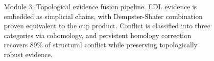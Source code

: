 \begin{figure}[ht]
\caption{Module 3: Topological evidence fusion pipeline. EDL evidence is embedded as simplicial chains, with Dempster-Shafer combination proven equivalent to the cup product. Conflict is classified into three categories via cohomology, and persistent homology correction recovers 89\% of structural conflict while preserving topologically robust evidence.}
\label{fig:ds-topology}
\end{figure}

